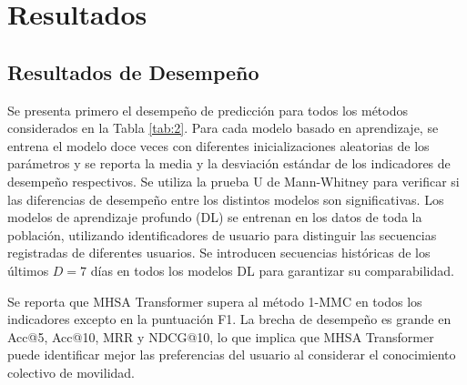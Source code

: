 \section{Resultados}


\subsection{Resultados de Desempe\~no}

\begin{table}[h]
    \centering
    \caption{Resultados de evaluación del rendimiento para la predicción de la próxima ubicación 
    sobre el conjunto de datos Geolife. Se reporta el promedio y la desviación estándar 
    en 12 ejecuciones diferentes.}
    \label{tab:2}
\end{table}




Se presenta primero el desempe\~no de predicci\'on para todos los 
m\'etodos considerados en la Tabla \ref{tab:2}. Para cada modelo basado en 
aprendizaje, se entrena el modelo doce veces con diferentes 
inicializaciones aleatorias de los par\'ametros y se reporta 
la media y la desviaci\'on est\'andar de los indicadores de 
desempe\~no respectivos. Se utiliza la prueba U de Mann-Whitney para 
verificar si las diferencias de desempe\~no entre los distintos modelos 
son significativas. Los modelos de aprendizaje profundo (DL) se 
entrenan en los datos de toda la poblaci\'on, utilizando identificadores 
de usuario para distinguir las secuencias registradas de diferentes usuarios. 
Se introducen secuencias hist\'oricas de los \'ultimos $D = 7$ d\'ias en 
todos los modelos DL para garantizar su comparabilidad.

Se reporta que MHSA Transformer supera al m\'etodo 1-MMC en todos los indicadores 
excepto en la puntuaci\'on F1. La brecha de desempe\~no es grande en 
Acc@5, Acc@10, MRR y NDCG@10, lo que implica que MHSA Transformer puede identificar 
mejor las preferencias del usuario al considerar el conocimiento 
colectivo de movilidad. 

